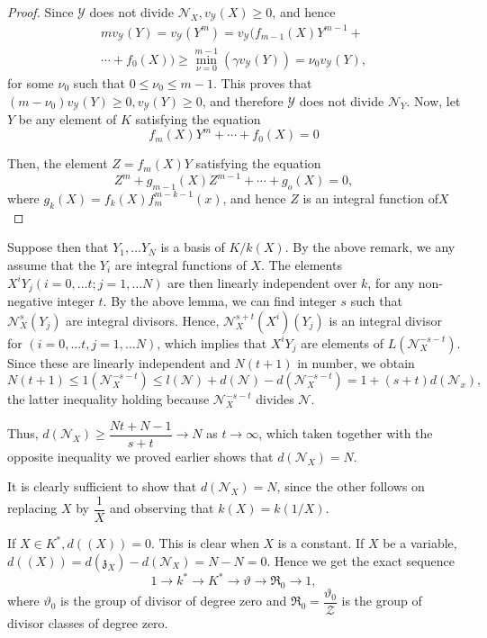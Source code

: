 \begin{proof}
  Since $\mathscr{Y}$ does not divide $\mathscr{N}_X,
  v_{\mathscr{Y}}(X) \ge 0$, and hence 
  \begin{multline*}
    mv_\mathscr{Y}(Y) = v_\mathscr{Y} (Y^m) = v_\mathscr{Y} (f_{m-1}
    (X) Y^{m-1} +\\ 
    \cdots + f_0 (X)) \ge \min^{m-1}_{\nu = 0} (\gamma
    v_\mathscr{Y} (Y)) = \nu_0 v_\mathscr{Y} (Y),
  \end{multline*}
  for some $\nu_0$ such that $0 \le \nu_0 \le m-1$. This proves that $
  (m-\nu_0) v_\mathscr{Y} (Y) \ge 0 , v_\mathscr{Y} (Y)\ge 0$, and
  therefore $\mathscr{Y}$ does not divide $\mathscr{N}_Y$. Now, let $Y$
  be any element of $K$ satisfying the equation 
  $$
  f_m(X) Y^m + \cdots + f_0 (X) = 0
  $$
  
  Then, the element $Z = f_m(X)Y$ satisfying the equation
  $$
  Z^m + g_{m-1} (X) Z^{m-1} + \cdots + g_o (X) = 0,
  $$
  where $g_k (X) = f_k (X) f^{m-k-1}_m (x)$, and hence $Z$ is an
  integral function of\pageoriginale $X$ 
\end{proof}

Suppose then that $Y_1 , \ldots Y_N$ is a basis of $K/k(X)$. By the
above remark, we any assume that the $Y_i$ are integral functions of
$X$. The elements $X^i Y_j (i=0, \ldots t; j=1 , \ldots N)$ are then
linearly independent over $k$, for any non-negative integer $t$. By
the above lemma, we can find integer $s$ such that $\mathscr{N}^s_X
(Y_j)$ are integral divisors. Hence, $\mathscr{N}_X^{s+t} (X^i) (Y_j)$
is an integral divisor for $(i=0, \ldots t, j=1, \ldots N)$, which
implies that $X^i Y_j$ are elements of
$L(\mathscr{N}_X^{-s-t})$. Since these are linearly independent and
$N(t+1)$ in number, we obtain 
$$
N(t+1) \le 1(\mathscr{N}_X^{-s-t}) \le l(\mathscr{N}) +d(\mathscr{N}) -
d(\mathscr{N}_X^{-s-t}) = 1+ (s+t) d (\mathscr{N}_x), 
$$
the latter inequality holding because $\mathscr{N}^{-s-t}_X$ divides
$\mathscr{N}$. 

Thus, $d(\mathscr{N}_X) \ge \dfrac{Nt + N -1}{s+t} \to N$ as $t \to
\infty$, which taken together with the opposite inequality we proved
earlier shows that $d(\mathscr{N}_X) = N$. 

It is clearly sufficient to show that $d(\mathscr{N}_X) = N$, since
the other follows on replacing $X$ by $\dfrac{1}{X}$ and observing
that $k(X) = k(1/X)$. 

\begin{corollary}\label{chap6:sec11:coro1}%
  If $X \in K^*, d((X)) = 0$. This is clear when $X$ is a constant. If
  $X$ be a variable, $d((X)) = d(\mathfrak{z}_X) -d(\mathscr{N}_X) =
  N-N=0$. Hence we get the exact sequence 
  $$
  1 \to k^* \to K^* \to \vartheta \to \mathfrak{R}_0 \to 1 ,
  $$
  where $\vartheta_0$ is the group of divisor of degree zero and
  $\mathfrak{R}_0 = \dfrac{\vartheta_0}{\mathscr{Z}}$ is the group of
  divisor classes of degree zero. 
\end{corollary}

